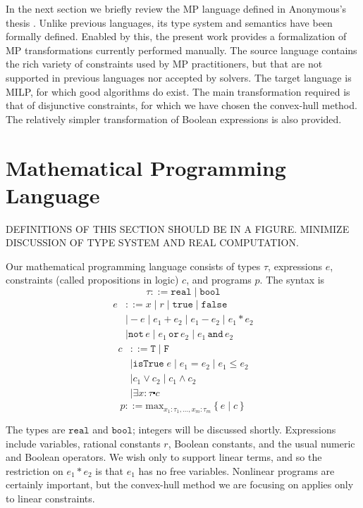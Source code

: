 \documentclass[preprint]{sigplanconf}%
\theoremstyle{remark}
\begin{document}
In the next section we briefly review the MP language defined in Anonymous's
thesis \cite{a3000}. Unlike previous languages, its type system and semantics
have been formally defined. Enabled by this, the present work provides a
formalization of MP transformations currently performed manually. The source
language contains the rich variety of constraints used by MP practitioners,
but that are not supported in previous languages nor accepted by solvers. The
target language is MILP, for which good algorithms do exist. The main
transformation required is that of disjunctive constraints, for which we have
chosen the convex-hull method. The relatively simpler transformation of
Boolean expressions is also provided.

\section{Mathematical Programming Language}

DEFINITIONS OF THIS SECTION SHOULD BE IN A FIGURE. MINIMIZE DISCUSSION OF TYPE
SYSTEM AND REAL COMPUTATION.

Our mathematical programming language consists of types $\tau$, expressions
$e$, constraints (called propositions in logic) $c$, and programs $p$. The
syntax is%
\begin{equation}
\tau::=\mathtt{real}\mid\mathtt{bool}%
\end{equation}%
\begin{align}
e  &  ::=x\mid r\mid\mathtt{true}\mid\mathtt{false}\nonumber\\
&  \mid-e\mid e_{1}+e_{2}\mid e_{1}-e_{2}\mid e_{1}\ast e_{2}\nonumber\\
&  \mid\mathtt{not}\,e\mid e_{1}\,\mathtt{or}\,e_{2}\mid e_{1}\,\mathtt{and}%
\,e_{2}%
\end{align}%
\begin{align}
c  &  ::=\mathtt{T}\mid\mathtt{F}\nonumber\\
&  \mid\mathtt{isTrue}\;e\mid e_{1}=e_{2}\mid e_{1}\leq e_{2}\nonumber\\
&  \mid c_{1}\vee c_{2}\mid c_{1}\wedge c_{2}\nonumber\\
&  \mid\exists x\!:\!\tau\centerdot c
\end{align}%
\begin{equation}
p::=\mathrm{max}_{x_{1}:\tau_{1},\ldots,x_{m}:\tau_{m}}\left\{  e\mid
c\right\}
\end{equation}


The types are $\mathtt{real}$ and $\mathtt{bool}$; integers will be discussed
shortly. Expressions include variables, rational constants $r$, Boolean
constants, and the usual numeric and Boolean operators. We wish only to
support linear terms, and so the restriction on $e_{1}\ast e_{2}$ is that
$e_{1}$ has no free variables. Nonlinear programs are certainly important, but
the convex-hull method we are focusing on applies only to linear constraints.
\end{document}
